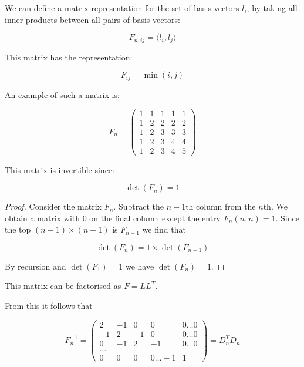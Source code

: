 \begin{definition}
We can define a matrix representation for the set of basis vectors \(l_i\), by taking all inner products between all pairs of basis vectors:

\begin{equation}
F_{n, ij} = \langle l_i, l_j \rangle
\end{equation}

This matrix has the representation:

\begin{equation}
F_{ij} = \min(i,j)
\end{equation}

An example of such a matrix is:

\begin{equation}
F_n= \begin{pmatrix}
 1 & 1 & 1 & 1  & 1 \\
  1 & 2 & 2 & 2  & 2\\
     1 & 2 & 3 & 3  & 3  \\
    1 & 2 & 3 & 4  & 4  \\
     1 & 2 & 3 & 4  & 5 
\end{pmatrix}
\label{def:Fmtx}
\end{equation}
\end{definition}

\begin{theorem}
This matrix is invertible since:

\begin{equation}
\det(F_n) = 1
\end{equation}
\end{theorem}
\begin{proof}
Consider the matrix \(F_n\). Subtract the \(n-1\)th column from the \(n\)th. We obtain a matrix with \(0\) on the final column except the entry \(F_n(n,n) = 1\). Since the top \((n-1) \times (n-1)\) is \(F_{n-1}\) we find that 

\begin{equation}
\det(F_n) = 1 \times \det(F_{n-1})
\end{equation} 

By recursion and \(\det(F_1) = 1\) we have \(\det(F_n) = 1\).

\end{proof}

This matrix can be factorised as \(F = LL^T\).

From this it follows that

\begin{equation}
F_n^{-1} = \begin{pmatrix}
 2 & -1 & 0 & 0  & 0 \ldots 0 \\
  -1 & 2 & -1 & 0  & 0 \ldots 0\\
     0 & -1 & 2 & -1  & 0 \ldots0  \\
    \ldots  \\
     0 & 0 & 0 & 0  \ldots -1 & 1 
\end{pmatrix} = D_n^TD_n
\end{equation}

